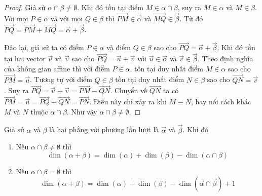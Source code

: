 \begin{proof}
	Giả sử $\alpha \cap \beta \neq \emptyset$. Khi đó tồn tại điểm $M \in \alpha \cap \beta$, suy ra $M \in \alpha$ và $M \in \beta$. Với mọi $P \in \alpha$ và với mọi $Q \in \beta$ thì $\overrightarrow{PM} \in \overrightarrow{\alpha}$ và $\overrightarrow{MQ} \in \overrightarrow{\beta}$. Từ đó $\overrightarrow{PQ} = \overrightarrow{PM} + \overrightarrow{MQ} = \overrightarrow{\alpha} + \overrightarrow{\beta}$.
	
	Đảo lại, giả sử ta có điểm $P \in \alpha$ và điểm $Q \in \beta$ sao cho $\overrightarrow{PQ} = \overrightarrow{\alpha} + \overrightarrow{\beta}$. Khi đó tồn tại hai vector $\overrightarrow{u}$ và $\overrightarrow{v}$ sao cho $\overrightarrow{PQ} = \overrightarrow{u} + \overrightarrow{v}$ với $\overrightarrow{u} \in \overrightarrow{\alpha}$ và $\overrightarrow{v} \in \overrightarrow{\beta}$. Theo định nghĩa của không gian affine thì với điểm $P \in \alpha$, tồn tại duy nhất điểm $M \in \alpha$ sao cho $\overrightarrow{PM} = \overrightarrow{u}$. Tương tự với điểm $Q \in \beta$ tồn tại duy nhất điểm $N \in \beta$ sao cho $\overrightarrow{QN} = \overrightarrow{v}$. Suy ra $\overrightarrow{PQ} = \overrightarrow{u} + \overrightarrow{v} = \overrightarrow{PM} - \overrightarrow{QN}$. Chuyển vế $\overrightarrow{QN}$ ta có $\overrightarrow{PM} = \overrightarrow{u} = \overrightarrow{PQ} + \overrightarrow{QN} = \overrightarrow{PN}$. Điều này chỉ xảy ra khi $M \equiv N$, hay nói cách khác $M$ và $N$ thuộc $\alpha \cap \beta$. Như vậy $\alpha \cap \beta \neq \emptyset$.
\end{proof}

\begin{theorem}
	Giả sử $\alpha$ và $\beta$ là hai phẳng với phương lần lượt là $\overrightarrow{\alpha}$ và $\overrightarrow{\beta}$. Khi đó
	
	\begin{enumerate}[nosep,leftmargin=*]
		\item Nếu $\alpha \cap \beta \neq \emptyset$ thì
        \begin{equation*}
            \dim(\alpha + \beta) = \dim(\alpha) + \dim(\beta) - \dim(\alpha \cap \beta)
        \end{equation*}
		\item Nếu $\alpha \cap \beta = \emptyset$ thì
        \begin{equation*}
            \dim(\alpha + \beta) = \dim(\alpha) + \dim(\beta) - \dim(\overrightarrow{\alpha} \cap \overrightarrow{\beta}) + 1
        \end{equation*}
	\end{enumerate}
\end{theorem}


